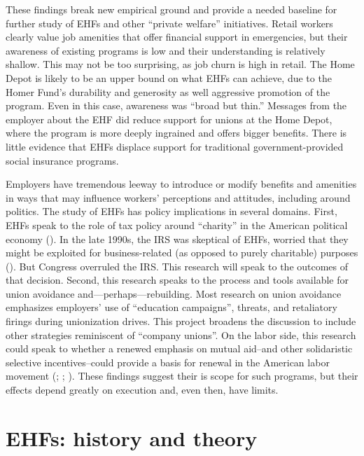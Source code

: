 \documentclass[
  11pt,
  oneside]{article}
\begin{document}
These findings break new empirical ground and provide a needed baseline for further study of EHFs and other ``private welfare'' initiatives. Retail workers clearly value job amenities that offer financial support in emergencies, but their awareness of existing programs is low and their understanding is relatively shallow. This may not be too surprising, as job churn is high in retail. The Home Depot is likely to be an upper bound on what EHFs can achieve, due to the Homer Fund's durability and generosity as well aggressive promotion of the program. Even in this case, awareness was ``broad but thin.'' Messages from the employer about the EHF did reduce support for unions at the Home Depot, where the program is more deeply ingrained and offers bigger benefits. There is little evidence that EHFs displace support for traditional government-provided social insurance programs.

Employers have tremendous leeway to introduce or modify benefits and amenities in ways that may influence workers' perceptions and attitudes, including around politics. The study of EHFs has policy implications in several domains. First, EHFs speak to the role of tax policy around ``charity'' in the American political economy (). In the late 1990s, the IRS was skeptical of EHFs, worried that they might be exploited for business-related (as opposed to purely charitable) purposes (). But Congress overruled the IRS. This research will speak to the outcomes of that decision. Second, this research speaks to the process and tools available for union avoidance and---perhaps---rebuilding. Most research on union avoidance emphasizes employers' use of ``education campaigns'', threats, and retaliatory firings during unionization drives. This project broadens the discussion to include other strategies reminiscent of ``company unions''. On the labor side, this research could speak to whether a renewed emphasis on mutual aid--and other solidaristic selective incentives--could provide a basis for renewal in the American labor movement (; ; ). These findings suggest their is scope for such programs, but their effects depend greatly on execution and, even then, have limits.

\section{EHFs: history and theory}\label{ehfs-history-and-theory}
\end{document}
